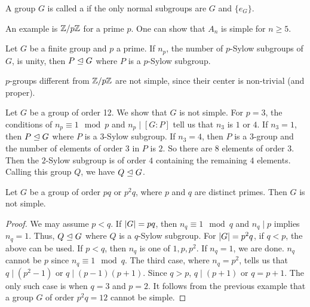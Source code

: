 \begin{definition}
    A group $G$ is called a  if the only normal subgroups are $G$ and $\{e_{G}\}$.
\end{definition}

An example is $\mathbb{Z}/p\mathbb{Z}$ for a prime $p$. One can show that $A_{n}$ is simple for $n \geq 5$.

\begin{corollary}
    Let $G$ be a finite group and $p$ a prime. If $n_{p}$, the number of $p$-Sylow subgroups of $G$, is unity, then $P \trianglelefteq G$ where $P$ is a $p$-Sylow subgroup.
\end{corollary}
$p$-groups different from $\mathbb{Z}/p\mathbb{Z}$ are not simple, since their center is non-trivial (and proper).

\begin{example}
    Let $G$ be a group of order 12. We show that $G$ is not simple. For $p = 3$, the conditions of $n_{p} \equiv 1 \mod p$ and $n_{p} \mid [G:P]$ tell us that $n_{3}$ is $1$ or $4$. If $n_{3} = 1$, then $P \trianglelefteq G$ where $P$ is a $3$-Sylow subgroup. If $n_{3} = 4$, then $P$ is a $3$-group and the number of elements of order $3$ in $P$ is $2$. So there are $8$ elements of order $3$. Then the $2$-Sylow subgroup is of order $4$ containing the remaining $4$ elements. Calling this group $Q$, we have $Q \trianglelefteq G$.
\end{example}


\begin{proposition}
    Let $G$ be a group of order $pq$ or $p^{2}q$, where $p$ and $q$ are distinct primes. Then $G$ is not simple.
\end{proposition}
\begin{proof}
    We may assume $p < q$. If $\left| G \right| = pq$, then $n_{q} \equiv 1 \mod q$ and $n_{q} \mid p$ implies $n_{q} = 1$. Thus, $Q \trianglelefteq G$ where $Q$ is a $q$-Sylow subgroup. For $\left| G \right| = p^{2}q$, if $q < p$, the above can be used. If $p < q$, then $n_{q}$ is one of $1,p,p^{2}$. If $n_{q} = 1$, we are done. $n_{q}$ cannot be $p$ since $n_{q} \equiv 1 \mod q$. The third case, where $n_{q} = p^{2}$, tells us that $q \mid (p^{2}-1)$ or $q \mid (p-1)(p+1)$. Since $q > p$, $q \mid (p+1)$ or $q = p+1$. The only such case is when $q = 3$ and $p = 2$. It follows from the previous example that a group $G$ of order $p^{2}q = 12$ cannot be simple.
\end{proof}

